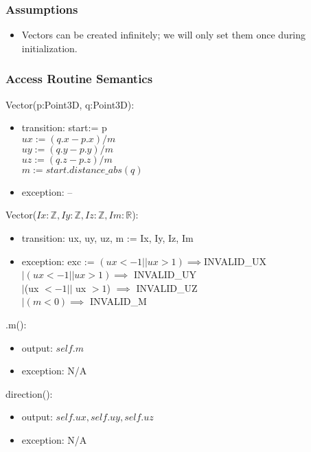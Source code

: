\documentclass[12pt, titlepage]{article}
\begin{document}
\subsubsection{Assumptions}
\begin{itemize}
	\item Vectors can be created infinitely; we will only set them once during 
	initialization.			
\end{itemize}

\subsubsection{Access Routine Semantics}
\noindent Vector(p:Point3D, q:Point3D):
\begin{itemize}
	\item transition: start:= p\\
	$ux:= (q.x - p.x)/m$ \\
	$uy:= (q.y - p.y)/m$ \\
	$uz:= (q.z - p.z)/m$ \\
	$m := start.distance\_abs(q)$\\
	\item exception: --
\end{itemize}

\noindent Vector($Ix: \mathbb{Z}, Iy: \mathbb{Z}, Iz: \mathbb{Z}, Im: 
\mathbb{R} 
$):
\begin{itemize}
	\item transition: ux, uy, uz, m := Ix, Iy, Iz, Im
	\item exception: exc := $(ux < -1 || ux > 1) \implies $INVALID\_UX \\
	$ | (ux < -1 || ux > 1) \implies$  INVALID\_UY \\ $| $(ux $< -1 ||$ ux $> 
	1$) $\implies $ INVALID\_UZ \\ $| (m < 0) \implies$ INVALID\_M
\end{itemize}

\noindent .m():
\begin{itemize}
	\item output: $self.m$
	\item exception: N/A
\end{itemize}

\noindent direction():
\begin{itemize}
	\item output: $self.ux, self.uy, self.uz$
	\item exception: N/A
\end{itemize}
\end{document}
